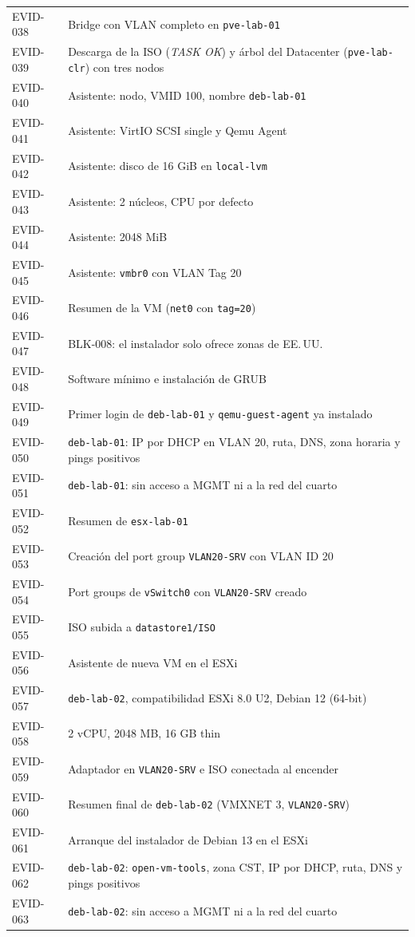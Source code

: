 \documentclass[11pt,a4paper]{article}
\begin{document}
{\begin{longtable}{L{1.6cm} L{13.7cm}}
  EVID-038 & Bridge con VLAN completo en \texttt{pve-lab-01}\\
  EVID-039 & Descarga de la ISO (\emph{TASK OK}) y árbol del Datacenter (\texttt{pve-lab-clr}) con tres nodos\\
  EVID-040 & Asistente: nodo, VMID 100, nombre \texttt{deb-lab-01}\\
  EVID-041 & Asistente: VirtIO SCSI single y Qemu Agent\\
  EVID-042 & Asistente: disco de 16 GiB en \texttt{local-lvm}\\
  EVID-043 & Asistente: 2 núcleos, CPU por defecto\\
  EVID-044 & Asistente: 2048 MiB\\
  EVID-045 & Asistente: \texttt{vmbr0} con VLAN Tag 20\\
  EVID-046 & Resumen de la VM (\texttt{net0} con \texttt{tag=20})\\
  EVID-047 & BLK-008: el instalador solo ofrece zonas de EE.\,UU.\\
  EVID-048 & Software mínimo e instalación de GRUB\\
  EVID-049 & Primer login de \texttt{deb-lab-01} y \texttt{qemu-guest-agent} ya instalado\\
  EVID-050 & \texttt{deb-lab-01}: IP por DHCP en VLAN 20, ruta, DNS, zona horaria y pings positivos\\
  EVID-051 & \texttt{deb-lab-01}: sin acceso a MGMT ni a la red del cuarto\\
  EVID-052 & Resumen de \texttt{esx-lab-01}\\
  EVID-053 & Creación del port group \texttt{VLAN20-SRV} con VLAN ID 20\\
  EVID-054 & Port groups de \texttt{vSwitch0} con \texttt{VLAN20-SRV} creado\\
  EVID-055 & ISO subida a \texttt{datastore1/ISO}\\
  EVID-056 & Asistente de nueva VM en el ESXi\\
  EVID-057 & \texttt{deb-lab-02}, compatibilidad ESXi 8.0 U2, Debian 12 (64-bit)\\
  EVID-058 & 2 vCPU, 2048 MB, 16 GB thin\\
  EVID-059 & Adaptador en \texttt{VLAN20-SRV} e ISO conectada al encender\\
  EVID-060 & Resumen final de \texttt{deb-lab-02} (VMXNET 3, \texttt{VLAN20-SRV})\\
  EVID-061 & Arranque del instalador de Debian 13 en el ESXi\\
  EVID-062 & \texttt{deb-lab-02}: \texttt{open-vm-tools}, zona CST, IP por DHCP, ruta, DNS y pings positivos\\
  EVID-063 & \texttt{deb-lab-02}: sin acceso a MGMT ni a la red del cuarto\\
  \bottomrule
\end{longtable}
}
\end{document}
